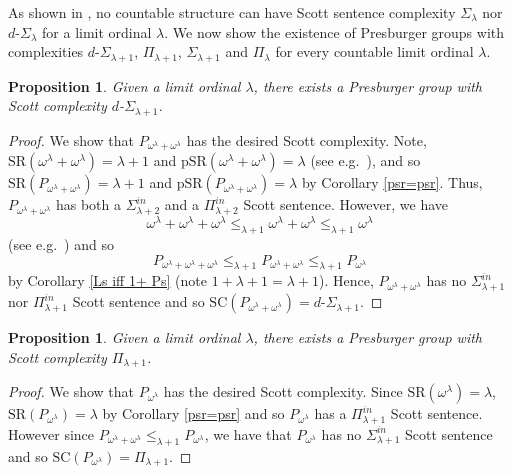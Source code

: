 \documentclass{amsart}%
\numberwithin{theorem}{section}
\newtheorem{proposition}[theorem]{Proposition}
\newcommand{\0}{\emptyset}
\newcommand{\SR}{\text{SR}}
\newcommand{\pSR}{\text{pSR}}
\newcommand{\SC}{\text{SC}}
\begin{document}
As shown in \cite{Alvir-et}, no countable structure can have Scott sentence complexity $\Sigma_\lambda$ nor $d$-$\Sigma_\lambda$ for a limit ordinal $\lambda$. We now show the existence of Presburger groups with complexities  $d$-$\Sigma_{\lambda+1}$, $\Pi_{\lambda+1}$, $\Sigma_{\lambda+1}$ and $\Pi_{\lambda}$ for every countable limit ordinal $\lambda$. 

\begin{proposition}
\label{d sigma l + 1}
    Given a limit ordinal $\lambda$, there exists a Presburger group with Scott complexity $d$-$\Sigma_{\lambda+1}$. 
\end{proposition}

\begin{proof}
    We show that $P_{\omega^\lambda+\omega^\lambda}$ has the desired Scott complexity. Note, $\SR(\omega^\lambda+\omega^\lambda)=\lambda+1$ and $\pSR(\omega^\lambda + \omega^\lambda)=\lambda$ (see e.g.\ \cite{CST}), and so $\SR(P_{\omega^\lambda+\omega^\lambda})=\lambda+1$ and $\pSR(P_{\omega^\lambda+\omega^\lambda})= \lambda$ by Corollary \ref{psr=psr}. Thus, $P_{\omega^\lambda+\omega^\lambda}$ has both a $\Sigma_{\lambda+2}^{in}$ and a $\Pi_{\lambda+2}^{in}$ Scott sentence. However, we have $$\omega^\lambda +\omega^\lambda+ \omega^\lambda\leq_{\lambda+1} \omega^\lambda + \omega^\lambda\leq_{\lambda+1} \omega^\lambda $$ (see e.g.\ \cite{AK-book}) and so $$P_{\omega^\lambda+\omega^\lambda+\omega^\lambda}\leq_{\lambda+1} P_{\omega^\lambda+ \omega^\lambda}\leq_{\lambda +1} P_{\omega^\lambda}$$ by Corollary \ref{Ls iff 1+ Ps} (note $1+\lambda +1 = \lambda +1$). Hence, $P_{\omega^\lambda+\omega^\lambda}$ has no $\Sigma_{\lambda+1}^{in}$ nor $\Pi_{\lambda+1}^{in}$ Scott sentence and so $\SC(P_{\omega^\lambda +\omega^\lambda})=d$-$\Sigma_{\lambda +1}$. 
\end{proof}

\begin{proposition}
\label{pi l + 1}
    Given a limit ordinal $\lambda$, there exists a Presburger group with Scott complexity $\Pi_{\lambda+1}$. 
\end{proposition}

\begin{proof}
    We show that $P_{\omega^\lambda}$ has the desired Scott complexity. Since $\SR(\omega^\lambda)=\lambda$, $\SR(P_{\omega^\lambda})=\lambda$ by Corollary \ref{psr=psr} and so $P_{\omega^\lambda}$ has a $\Pi_{\lambda+1}^{in}$ Scott sentence. However since $P_{\omega^\lambda+\omega^\lambda}\leq_{\lambda+1} P_{\omega^\lambda}$, we have that $P_{\omega^\lambda}$ has no $\Sigma^{in}_{\lambda+1}$ Scott sentence and so $\SC(P_{\omega^\lambda})=\Pi_{\lambda+1}$. 
\end{proof}
\end{document}
